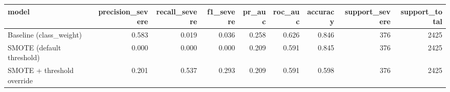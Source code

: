 \begin{tabular}{lrrrrrrrr}
\toprule
model & precision_severe & recall_severe & f1_severe & pr_auc & roc_auc & accuracy & support_severe & support_total \\
\midrule
Baseline (class_weight) & 0.583 & 0.019 & 0.036 & 0.258 & 0.626 & 0.846 & 376 & 2425 \\
SMOTE (default threshold) & 0.000 & 0.000 & 0.000 & 0.209 & 0.591 & 0.845 & 376 & 2425 \\
SMOTE + threshold override & 0.201 & 0.537 & 0.293 & 0.209 & 0.591 & 0.598 & 376 & 2425 \\
\bottomrule
\end{tabular}
